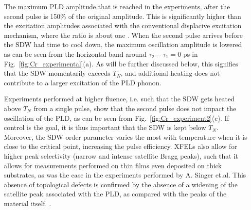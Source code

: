 The maximum PLD amplitude that is reached in the experiments, after the second pulse is 150\% of the original amplitude.
This is significantly higher than the excitation amplitudes associated with the conventional displacive excitation mechanism, where the ratio is about one \cite{Singer2015,Zeiger1992}. 
When the second pulse arrives before the SDW had time to cool down, the maximum oscillation amplitude is lowered as can be seen from the horizontal band around $\tau_2 - \tau_1 = 0$ ps in Fig.~\ref{fig:Cr_experimental}(a).
As will be further discussed below, this signifies that the SDW momentarily exceeds $T_N$, and additional heating does not contribute to a larger excitation of the PLD phonon.

Experiments performed at higher fluence, i.e. such that the SDW gets heated above $T_N$ from a single pulse, show that the second pulse does not impact the oscillation of the PLD, as can be seen from Fig.~\ref{fig:Cr_experiment2}(c).
If control is the goal, it is thus important that the SDW is kept below $T_N$.
Moreover, the SDW order parameter varies the most with temperature when it is close to the critical point, increasing the pulse efficiency.
XFELs also allow for higher peak selectivity (narrow and intense satellite Bragg peaks), such that it allows for measurements performed on thin films even deposited on thick substrates, as was the case in the experiments performed by A. Singer et.al.
This absence of topological defects is confirmed by the absence of a widening of the satellite peak associated with the PLD, as compared with the peaks of the material itself. .

